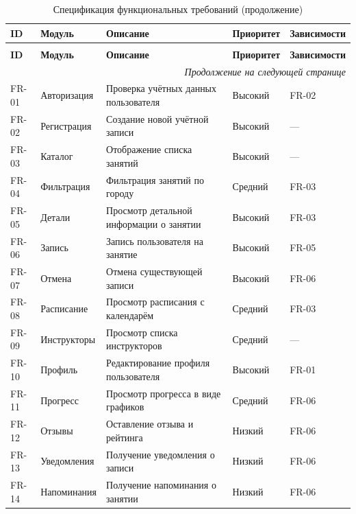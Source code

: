 \renewcommand{\arraystretch}{1.3}
\begin{longtable}{|p{1.8cm}|p{2.7cm}|p{4cm}|p{2.5cm}|p{3cm}|}
	\caption{Спецификация функциональных требований}
	\label{tab:specification} \\
	\hline
	\textbf{ID} & \textbf{Модуль} & \textbf{Описание} & \textbf{Приоритет} & \textbf{Зависимости} \\
	\hline
	\endfirsthead
	
	\caption{Спецификация функциональных требований (продолжение)} \\
	\hline
	\textbf{ID} & \textbf{Модуль} & \textbf{Описание} & \textbf{Приоритет} & \textbf{Зависимости} \\
	\hline
	\endhead
	
	\hline
	\multicolumn{5}{r}{\textit{Продолжение на следующей странице}} \\
	\endfoot
	
	\hline
	\endlastfoot
	
	FR-01 & Авторизация & Проверка учётных данных пользователя & Высокий & FR-02 \\
	\hline
	FR-02 & Регистрация & Создание новой учётной записи & Высокий & — \\
	\hline
	FR-03 & Каталог & Отображение списка занятий & Высокий & — \\
	\hline
	FR-04 & Фильтрация & Фильтрация занятий по городу & Средний & FR-03 \\
	\hline
	FR-05 & Детали & Просмотр детальной информации о занятии & Высокий & FR-03 \\
	\hline
	FR-06 & Запись & Запись пользователя на занятие & Высокий & FR-05 \\
	\hline
	FR-07 & Отмена & Отмена существующей записи & Высокий & FR-06 \\
	\hline
	FR-08 & Расписание & Просмотр расписания с календарём & Средний & FR-03 \\
	\hline
	FR-09 & Инструкторы & Просмотр списка инструкторов & Средний & — \\
	\hline
	FR-10 & Профиль & Редактирование профиля пользователя & Высокий & FR-01 \\
	\hline
	FR-11 & Прогресс & Просмотр прогресса в виде графиков & Средний & FR-06 \\
	\hline
	FR-12 & Отзывы & Оставление отзыва и рейтинга & Низкий & FR-06 \\
	\hline
	FR-13 & Уведомления & Получение уведомления о записи & Низкий & FR-06 \\
	\hline
	FR-14 & Напоминания & Получение напоминания о занятии & Низкий & FR-06 \\
	\hline
\end{longtable}
\renewcommand{\arraystretch}{1}

